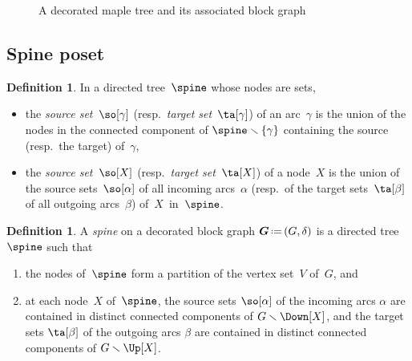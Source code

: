 \documentclass{amsart}
\theoremstyle{definition}
\newtheorem{definition}[theorem]{Definition}
\renewcommand{\b}[1]{{\boldsymbol{#1}}} %
\newcommand{\ssm}{\smallsetminus} %
\newcommand{\eqdef}{\mbox{\,\raisebox{0.2ex}{\scriptsize\ensuremath{\mathrm:}}\ensuremath{=}\,}} %
\newcommand{\darkblue}{\color{darkblue}} %
\newcommand{\defn}[1]{\textsl{\darkblue #1}} %
\newcommand{\vincent}[1]{\todo[color=blue!30]{#1 \\ \hfill --- V.}}
\newcommand{\vertexSet}{V}
\newcommand{\decoration}{\delta}
\begin{document}
\begin{figure}
{}
\caption{A decorated maple tree and its associated block graph}
\label{fig:mapleBlock}
\end{figure} 


\subsection{Spine poset}

\begin{definition}
  In a directed tree~$\spine$ whose nodes are sets,
  \begin{itemize}
    \item the \defn{source set}~$\so[\gamma]$ (resp.~\defn{target set}~$\ta[\gamma]$) of an arc~$\gamma$ is the union of the nodes in the connected component of $\spine \ssm \{\gamma\}$ containing the source (resp.~the target) of~$\gamma$,
    \item the \defn{source set}~$\so[X]$ (resp.~\defn{target set}~$\ta[X]$) of a node~$X$ is the union of the source sets~$\so[\alpha]$ of all incoming arcs~$\alpha$ (resp.~of the target sets~$\ta[\beta]$ of all outgoing arcs~$\beta$) of~$X$~in~$\spine$.
  \end{itemize}
\end{definition}


\begin{definition}
  \label{def:spine}
  A \defn{spine} on a decorated block graph $\b{G} \eqdef (G,\decoration)$ is a directed tree $\spine$ such that
  \begin{enumerate}
    \item the nodes of~$\spine$ form a partition of the vertex set~$\vertexSet$ of~$G$, and 
    \item at each node~$X$ of~$\spine$, the source sets $\so[\alpha]$ of the incoming arcs $\alpha$ are contained in distinct connected components of $G \ssm \Down[X]$, and the target sets $\ta[\beta]$ of the outgoing arcs $\beta$ are contained in distinct connected components of $G \ssm \Up[X]$.
  \end{enumerate}
\end{definition}
\end{document}
